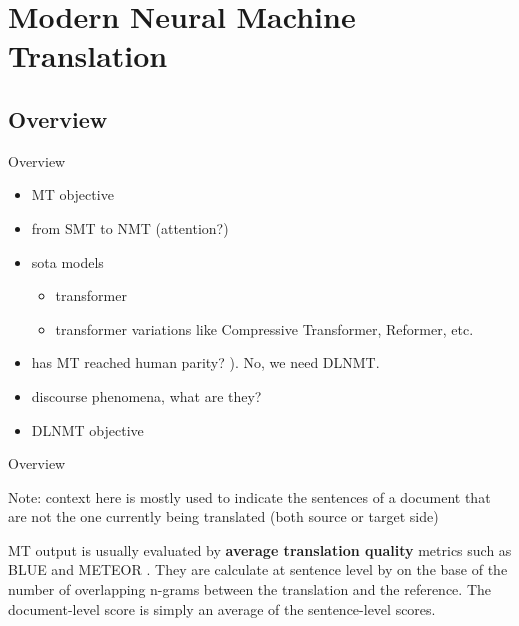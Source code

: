 \section{Modern Neural Machine Translation}

\subsection{Overview}
\begin{frame}{Overview}
	
	\begin{itemize}
		\item MT objective
		\item from SMT to NMT (attention?)
		\item sota models
			\begin{itemize}
				\item transformer
				\item transformer variations like Compressive Transformer, Reformer, etc.
			\end{itemize}
		\item has MT reached human parity? \cite{laubli_has_2018}). No, we need DLNMT.
		\item discourse phenomena, what are they?
		\item DLNMT objective
	\end{itemize}
	
	
\end{frame}

\begin{frame}{Overview}
	
	Note: context here is mostly used to indicate the sentences of a document that are not the one currently being translated (both source or target side)
	
	MT output is usually evaluated by \textbf{average translation quality} metrics such as BLUE \cite{papineni_bleu_2002} and METEOR \cite{banerjee_meteor_2005}. They are calculate at sentence level by on the base of the number of overlapping n-grams between the translation and the reference. The document-level score is simply an average of the sentence-level scores.
	
	
\end{frame}

